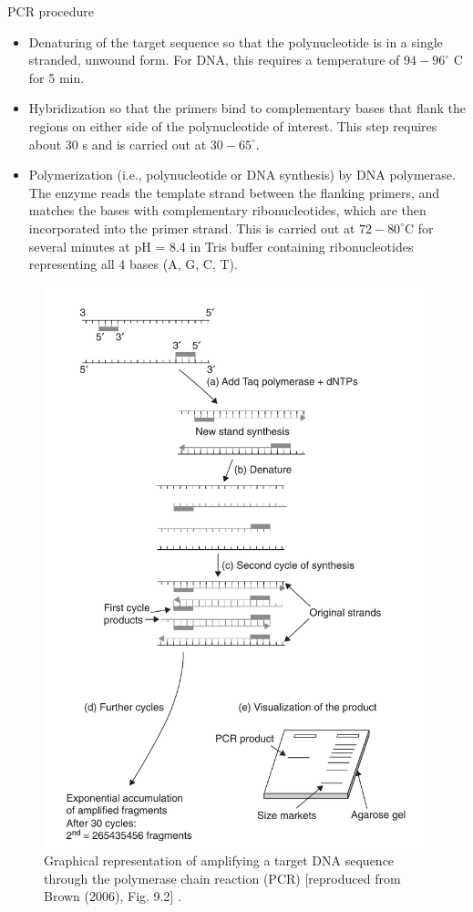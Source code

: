\documentclass[
  ignorenonframetext,
  aspectratio=169]{beamer}
\providecommand{\tightlist}{%
  \setlength{\itemsep}{0pt}\setlength{\parskip}{0pt}}
\begin{document}
\begin{frame}{PCR procedure}
\protect\hypertarget{pcr-procedure}{}
\begin{itemize}
\tightlist
\item
  Denaturing of the target sequence so that the polynucleotide is in a
  single stranded, unwound form. For DNA, this requires a temperature of
  \(94-96^\circ\) C for 5 min.
\item
  Hybridization so that the primers bind to complementary bases that
  flank the regions on either side of the polynucleotide of interest.
  This step requires about 30 s and is carried out at \(30-65^\circ\).
\item
  Polymerization (i.e., polynucleotide or DNA synthesis) by DNA
  polymerase. The enzyme reads the template strand between the flanking
  primers, and matches the bases with complementary ribonucleotides,
  which are then incorporated into the primer strand. This is carried
  out at \(72-80^\circ\)C for several minutes at pH = 8.4 in Tris buffer
  containing ribonucleotides representing all 4 bases (A, G, C, T).
\end{itemize}
\end{frame}

\begin{frame}{}
\protect\hypertarget{section-3}{}
\begin{figure}
\includegraphics[width=0.34\linewidth]{./../images/pcr_steps} \caption{Graphical representation of amplifying a target DNA sequence through the polymerase chain reaction (PCR) [reproduced from Brown (2006), Fig. 9.2] .}\label{fig:pcr-steps}
\end{figure}
\end{frame}
\end{document}
